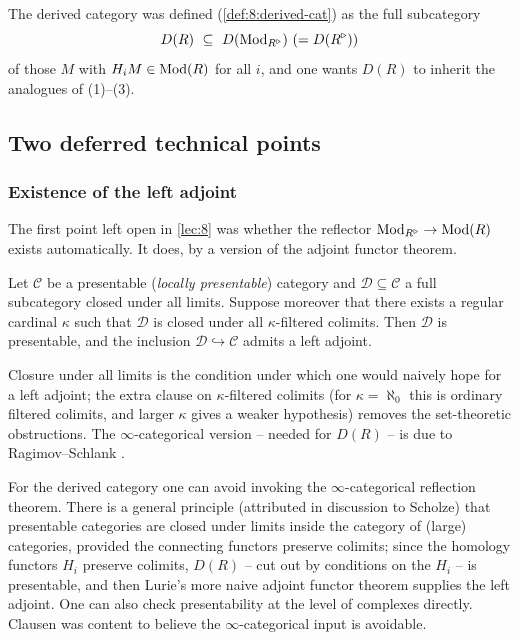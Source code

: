 The derived category was defined (\cref{def:8:derived-cat}) as the full
subcategory
\begin{equation*}
D(R)\ \subseteq\ D(\operatorname{Mod}_{R^{\triangleright}})\ (=D(R^{\triangleright}))
\end{equation*}
of those $M$ with $H_{i}M\in\operatorname{Mod}(R)$ for all $i$, and one wants $D(R)$ to
inherit the analogues of (1)--(3).

\subsection{Two deferred technical points}

\subsubsection*{Existence of the left adjoint}

The first point left open in \cref{lec:8} was whether the reflector
$\operatorname{Mod}_{R^{\triangleright}}\to\operatorname{Mod}(R)$ exists automatically. It does, by a version of the
adjoint functor theorem.

\begin{theorem}
\label{prop:9:reflection}
Let $\mathcal C$ be a presentable (\emph{locally presentable}) category and
$\mathcal D\subseteq\mathcal C$ a full subcategory closed under all limits.
Suppose moreover that there exists a regular cardinal $\kappa$ such that
$\mathcal D$ is closed under all $\kappa$-filtered colimits. Then $\mathcal D$
is presentable, and the inclusion $\mathcal D\hookrightarrow\mathcal C$ admits a
left adjoint.
\end{theorem}

Closure under all limits is the condition under which one would naively hope for
a left adjoint; the extra clause on $\kappa$-filtered colimits (for
$\kappa=\aleph_{0}$ this is ordinary filtered colimits, and larger $\kappa$
gives a weaker hypothesis) removes the set-theoretic obstructions. The
$\infty$-categorical version -- needed for $D(R)$ -- is due to
Ragimov--Schlank \cite{ragimov2026inftycategoricalreflectiontheoremapplications}.

\begin{remark}
\label{rmk:9:presentable-derived}
For the derived category one can avoid invoking the $\infty$-categorical
reflection theorem. There is a general principle (attributed in discussion to
Scholze) that presentable categories are closed under limits inside the
category of (large) categories, provided the connecting functors preserve
colimits; since the homology functors $H_{i}$ preserve colimits, $D(R)$ -- cut
out by conditions on the $H_{i}$ -- is presentable, and then Lurie's more
naive adjoint functor theorem \cite{lurie2017higher} supplies the left adjoint.
One can also check presentability at the level of complexes directly. Clausen
was content to believe the $\infty$-categorical input is avoidable.
\end{remark}

